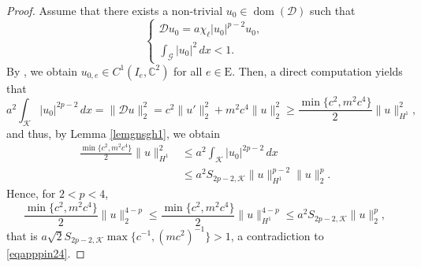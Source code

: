 \documentclass[11pt]{amsart}
\newcommand{\abs}[1]{\lvert#1\rvert}
\newcommand{\norm}[1]{\lVert#1\rVert}
\newcommand{\D}{\mathcal{D}}
\newcommand{\G}{\mathcal{G}}
\newcommand{\K}{\mathcal{K}}
\numberwithin{equation}{section}
\begin{document}
\begin{proof}
Assume that there exists a non-trivial $u_{0} \in \operatorname{dom}(\D)$ such that
    $$
\left\{\begin{array}{l}
\D u_{0}=a\chi_{\ell}\abs{u_{0}}^{p-2} u_{0}, \\
\int_{\G}\left|u_{0}\right|^{2} \,dx < 1.
\end{array}\right.
$$
By \cite[Remark 6 in Chapter 8]{Ha}, we obtain $u_{0,e}\in C^1(I_e,\mathbb{C}^2)$ for all $e \in \mathrm{E}$. Then, a direct computation yields that
\begin{equation}\label{eqappdu2}
    a^2\int_{\K}\abs{u_{{0}}}^{2p-2}\, dx= \norm{\D u}_2^2=c^2\norm{u'}_2^2 + m^2c^4\norm{u}_2^2\geq \frac{\min\{c^2,m^2c^4\}}{2}\norm{u}_{H^1}^2,
\end{equation}
and thus, by Lemma \eqref{lemgnsgh1}, we obtain
\[\begin{aligned}
    \frac{\min\{c^2,m^2c^4\}}{2}\norm{u}_{H^1}^2&\leq a^2 \int_{\K}\abs{u_{{0}}}^{2p-2}\, dx \\
    &\leq a^2S_{2p-2,\K}\norm{u}_{H^1}^{p-2}\norm{u}_2^p.
\end{aligned}
\]
Hence, for $2<p<4$,
\[
    \frac{\min\{c^2,m^2c^4\}}{2}\norm{u}_2^{4-p}\leq \frac{\min\{c^2,m^2c^4\}}{2}\norm{u}_{H^1}^{4-p} \leq a^2S_{2p-2,\K}\norm{u}_2^p,
\]
that is $a\sqrt2S_{2p-2,\K}\max\{c^{-1},(mc^2)^{-1}\}>1$,  a contradiction to \eqref{eqapppin24}.


\end{proof}
\end{document}
